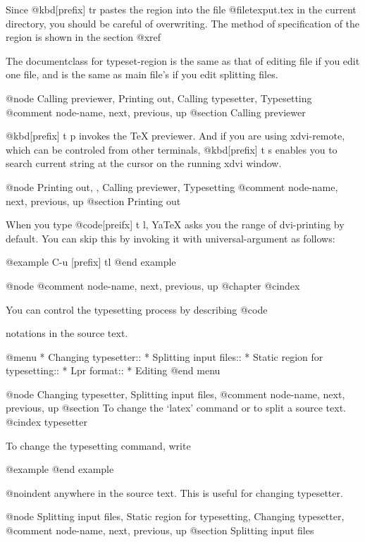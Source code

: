   Since @kbd{[prefix] tr} pastes the region into the file
@file{texput.tex} in the current directory, you should be careful of
overwriting.  The method of specification of the region is shown in the
section @xref{%

  The documentclass  for typeset-region is the same as that of editing
file if you edit one  file,  and is the same as main file's if you
edit splitting files.

@node Calling previewer, Printing out, Calling typesetter, Typesetting
@comment  node-name,  next,  previous,  up
@section Calling previewer

  @kbd{[prefix] t p} invokes the TeX previewer.  And if you are using
xdvi-remote, which can be controled from other terminals, @kbd{[prefix] t
s} enables you to search current string at the cursor on the running xdvi
window.

@node Printing out,  , Calling previewer, Typesetting
@comment  node-name,  next,  previous,  up
@section Printing out

  When you type @code{[preifx] t l}, YaTeX asks you the range of
dvi-printing by default.  You can skip this by invoking it with
universal-argument as follows:

@example
        C-u [prefix] tl
@end example

@node %
@comment  node-name,  next,  previous,  up
@chapter %
@cindex %

  You can control the typesetting process by describing @code{%
notations in the source text.

@menu
* Changing typesetter::         
* Splitting input files::       
* Static region for typesetting::  
* Lpr format::                  
* Editing %
@end menu

@node Changing typesetter, Splitting input files, %
@comment  node-name,  next,  previous,  up
@section To change the `latex' command or to split a source text.
@cindex typesetter

  To change the typesetting command, write

@example
@end example

@noindent
anywhere in the source text.  This is useful for changing
typesetter.

@node Splitting input files, Static region for typesetting, Changing typesetter, %
@comment  node-name,  next,  previous,  up
@section Splitting input files

}}
